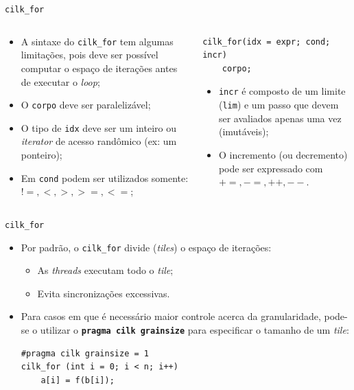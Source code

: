 \documentclass{beamer}
\begin{document}
\begin{frame}[fragile]{\texttt{cilk\_for}}
\begin{columns}[T]
\begin{column}{0.5\textwidth}
\begin{itemize}
    \item A sintaxe do \texttt{cilk\_for} tem algumas limitações, pois deve ser
    possível computar o espaço de iterações antes de executar o \textit{loop};
    \item O \texttt{corpo} deve ser paralelizável;
    \item O tipo de \texttt{idx} deve ser um inteiro ou \textit{iterator} de
    acesso randômico (ex: um ponteiro);
    \item Em \texttt{cond} podem ser utilizados somente: ${ !=, <, >, >=, <= }$;
\end{itemize}
\end{column}

\begin{column}{0.5\textwidth}
\begin{block}{}
\begin{lstlisting}
cilk_for(idx = expr; cond; incr)
    corpo;
\end{lstlisting}
\end{block}
\begin{itemize}
    \item \texttt{incr} é composto de um limite (\texttt{lim}) e um passo que
    devem ser avaliados apenas uma vez (imutáveis);
    \item O incremento (ou decremento) pode ser expressado com ${ +=, -=, ++,
    --}$.
\end{itemize}
\end{column}

\end{columns}
\end{frame}

\begin{frame}[fragile]{\texttt{cilk\_for}}
\begin{itemize}
    \item Por padrão, o \texttt{cilk\_for} divide (\textit{tiles}) o espaço de
    iterações: 
    \begin{itemize}
        \item As \textit{threads} executam todo o \textit{tile};
        \item Evita sincronizações excessivas.
    \end{itemize}
    \item Para casos em que é necessário maior controle acerca da granularidade,
    pode-se o utilizar o \textbf{\texttt{pragma cilk grainsize}} para
    especificar o tamanho de um \textit{tile}:
\begin{lstlisting}
#pragma cilk grainsize = 1
cilk_for (int i = 0; i < n; i++)
    a[i] = f(b[i]);
\end{lstlisting}
\end{itemize}

\end{frame}
\end{document}
